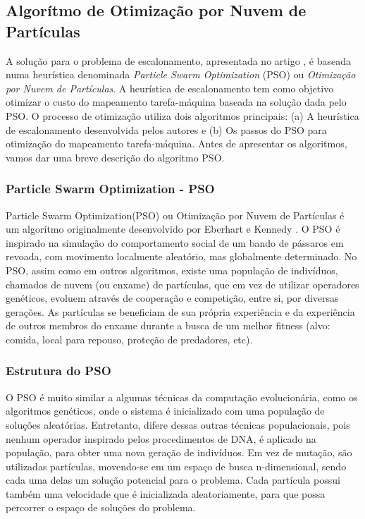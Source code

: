 \documentclass[a4paper,10pt]{article}
\begin{document}
\subsection{Algorítmo de Otimização por Nuvem de Partículas}
\label{psoalgo}
A solução para o problema de escalonamento, apresentada no artigo \cite{pso_a}, é baseada numa heurística 
denominada \emph{Particle Swarm Optimization} (PSO) ou \emph{Otimização por Nuvem de Partículas}. A heurística de 
escalonamento tem como objetivo otimizar 
o custo do mapeamento tarefa-máquina baseada na solução dada pelo PSO. O processo de otimização utiliza 
dois algoritmos principais: (a) A heurística de escalonamento desenvolvida pelos autores e (b) Os passos do PSO 
para otimização do mapeamento tarefa-máquina. Antes de apresentar os algoritmos, vamos 
dar uma breve descrição do algoritmo PSO.

\subsubsection{Particle Swarm Optimization - PSO}

Particle Swarm Optimization(PSO) ou Otimização por Nuvem de Partículas é um algorítmo originalmente 
desenvolvido por Eberhart e Kennedy \cite{pso_article}. O PSO é inspirado na simulação do comportamento social de um 
bando de pássaros em revoada, com movimento localmente aleatório, mas globalmente determinado. No PSO, 
assim como em outros algoritmos, existe uma população de indivíduos, chamados de nuvem (ou enxame) de 
partículas, que em vez de utilizar operadores genéticos, evoluem através de cooperação e competição, entre si, 
por diversas gerações. As partículas se beneficiam de sua própria experiência e da experiência de outros membros 
do enxame durante a busca de um melhor fitness (alvo: comida, local para repouso, proteção de predadores, etc).

\subsubsection{Estrutura do PSO}

O PSO é muito similar a algumas técnicas da computação evolucionária, como os algoritmos genéticos, onde o 
sistema é inicializado com uma população de soluções aleatórias. Entretanto, difere dessas outras técnicas 
populacionais, pois nenhum operador inspirado pelos procedimentos de DNA, é aplicado na população, para obter 
uma nova geração de indivíduos. Em vez de mutação, são utilizadas partículas, movendo-se em um espaço de busca 
n-dimensional, sendo cada uma delas um solução potencial para o problema. Cada partícula possui também uma 
velocidade que é inicializada aleatoriamente, para que possa percorrer o espaço de soluções do problema.
\end{document}
